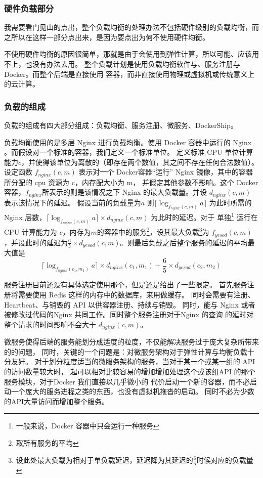 \subsubsection{硬件负载部分}
我需要看门见山的点出，整个负载均衡的处理办法不包括硬件级别的负载均衡，而之所以在这样一部分点出来，是因为要点出为何不使用硬件均衡。

不使用硬件均衡的原因很简单，那就是由于会使用到弹性计算，所以可能、应该用不上，也没有办法去用。
整个负载计划是使用负载均衡软件与、服务注册与Docker。而整个后端是直接使用 容器，而非直接使用物理或虚拟机或传统意义上的云计算。
\subsubsection{负载的组成}
负载的组成有四大部分组成：负载均衡、服务注册、微服务、DockerShip。

负载均衡使用的是多层 Nginx 进行负载均衡。使用 Docker 容器中运行的 Nginx 。而假设对一个标准的容器，我们定义一个标准单位。
定义标准 CPU 单位计算能力$c$，并使得该单位为离散的（即存在两个数值，其之间不存在任何合法数值）。设定函数
$f_{nginx}(c,m)$ 表示对一个 Docker容器“运行” Nginx 镜像，其中的容器所分配的 cpu 资源为 c，内存配大小为 m，
并假定其他参数不影响。这个 Docker 容器，$f_{nginx}$所表示的则是该情况之下 Nginx 的最大负载量。并设 $d_{nginx}(c,m)$ 表示该情况下的延迟。
假设当前的负载量为$a$ 则$\lceil \log_{f_{nginx}(c,m)}a\rceil$ 为此时所需的 Nginx 层数，$\lceil \log_{f_{nginx}(c,m)}a\rceil \times d_{nginx}(c,m)$ 为此时的延迟。对于 单独\footnote{一般来说，Docker 容器中只会运行一种服务} 
运行在 CPU 计算能力为 $c$，内存为$m$的容器中的服务\footnote{取所有服务的平均}，设其最大负载\footnote{设此处最大负载为相对于单负载延迟，延迟降为其延迟的$\frac{6}{5}$时候对应的负载量}为
 $f_{yesod}(c,m)$，并设此时的延迟为$\frac{6}{5} \times d_{yesod}(c,m)$。则最后负载之后整个服务的延迟的平均最大值是$$\lceil \log_{f_{nginx}(c_1,m_1)}a\rceil \times d_{nginx}(c_1,m_1)+\frac{6}{5} \times d_{yesod}(c_2,m_2)$$

服务注册目前还没有具体选定使用那个，但是还是给出了一些限定。
首先服务注册将需要使用 Redis 这样的内存中的数据库，来用做缓存。
同时会需要有注册、Heartbeat、与销毁的 API 以供容器注册、持续与销毁。
同时，能与 Nginx 或者被修改过代码的Nginx 共同工作。同时整个服务注册对于Nginx 的查询
的延时对整个请求的时间影响不会大于 $d_{nginx}(c,m)$。

微服务使得后端的服务能划分成适度的粒度，不仅能解决服务过于庞大复杂所带来的的问题，
同时，关键的一个问题是：对微服务架构对于弹性计算与均衡负载十分友好。
对于划分粒度适当的微服务架构的服务，当对于某一个或某一组的 API 的访问数量较大时，
起可以相对比较容易的增加增加处理这个或该组API 的那个服务模块，对于Docker 我们直接以几乎微小的
代价启动一个新的容器，而不必启动一个庞大的服务进程之类的东西，也没有虚拟机拖沓的启动。
同时不必为少数的API大量访问而增加整个服务。

